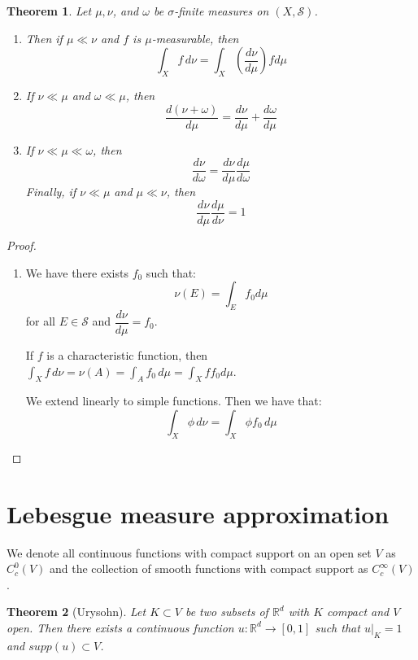 \documentclass{article}
\newtheorem{theorem}{Theorem}
\theoremstyle{definition}
\numberwithin{theorem}{section}
\numberwithin{equation}{section}
\begin{document}
\begin{theorem}
	Let $\mu, \nu$, and $\omega$ be $\sigma$-finite measures on $(X, \mathcal{S})$.
	\begin{enumerate}
		\item Then if $\mu \ll \nu$ and $f$ is $\mu$-measurable, then
		\begin{equation}
			\int_X f \, d\nu = \int_X (\dfrac{d\nu}{d\mu}) f d\mu
		\end{equation}
		\item If $\nu \ll \mu$ and $\omega \ll \mu$, then
		\begin{equation}
			\dfrac{d(\nu + \omega)}{d\mu} = \dfrac{d\nu}{d\mu} + \dfrac{d\omega}{d\mu}
		\end{equation}
		\item If $\nu \ll \mu \ll \omega$, then
		\begin{equation}
			\dfrac{d\nu}{d\omega} = \dfrac{d\nu}{d\mu} \dfrac{d\mu}{d\omega}
		\end{equation}
		Finally, if $\nu \ll \mu$ and $\mu \ll \nu$, then
		\begin{equation}
			\dfrac{d\nu}{d\mu} \dfrac{d\mu}{d\nu} = 1
		\end{equation}
	\end{enumerate}
\end{theorem}

\begin{proof}
	\begin{enumerate}
		\item 
		We have there exists $f_0$ such that:
		\begin{equation}
			\nu(E) = \int_E f_0 d\mu
		\end{equation}
		for all $E \in \mathcal{S}$ and $\dfrac{d\nu}{d\mu} = f_0$.
		
		If $f$ is a characteristic function, then $\int_X f \, d\nu = \nu(A) = \int_A f_0 \, d\mu = \int_X f f_0 d\mu$. 
		
		We extend linearly to simple functions. 
		Then we have that:
		\begin{equation}
			\int_X \phi \, d\nu = \int_X \phi f_0 \, d\mu
		\end{equation}
	\end{enumerate}
\end{proof}

\section{Lebesgue measure approximation}
We denote all continuous functions with compact support on an open set $V$ as $C^0_c(V)$ and the collection of smooth functions with compact support as $C^\infty_c(V)$. 
\begin{theorem}[Urysohn]
	Let $K \subset V$ be two subsets of $\mathbb{R}^d$ with $K$ compact and $V$ open. Then there exists a continuous function $u: \mathbb{R}^d  \rightarrow [0, 1]$ such that $u|_K = 1$ and $supp(u) \subset V$. 
\end{theorem}
\end{document}
